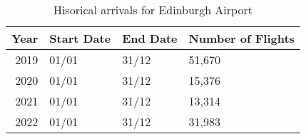 \begin{table}[ht]
\centering
\begin{tabular}{rlll}
  \hline
{\textbf{Year}} & {\textbf{Start Date}} & {\textbf{End Date}} & {\textbf{Number of Flights}} \\ 
  \hline
2019 & 01/01 & 31/12 & 51,670 \\ 
  2020 & 01/01 & 31/12 & 15,376 \\ 
  2021 & 01/01 & 31/12 & 13,314 \\ 
  2022 & 01/01 & 31/12 & 31,983 \\ 
   \hline
\end{tabular}
\caption{Hisorical arrivals for Edinburgh Airport \label{tab:observed_schedule}} 
\end{table}
